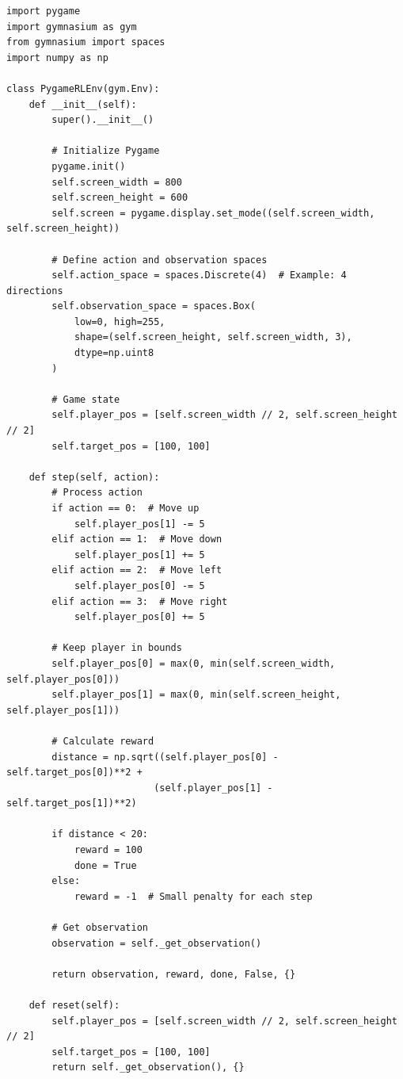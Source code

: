 \documentclass[12pt]{article}
\begin{document}
{{{\begin{verbatim}
import pygame
import gymnasium as gym
from gymnasium import spaces
import numpy as np

class PygameRLEnv(gym.Env):
    def __init__(self):
        super().__init__()
        
        # Initialize Pygame
        pygame.init()
        self.screen_width = 800
        self.screen_height = 600
        self.screen = pygame.display.set_mode((self.screen_width, self.screen_height))
        
        # Define action and observation spaces
        self.action_space = spaces.Discrete(4)  # Example: 4 directions
        self.observation_space = spaces.Box(
            low=0, high=255, 
            shape=(self.screen_height, self.screen_width, 3), 
            dtype=np.uint8
        )
        
        # Game state
        self.player_pos = [self.screen_width // 2, self.screen_height // 2]
        self.target_pos = [100, 100]
        
    def step(self, action):
        # Process action
        if action == 0:  # Move up
            self.player_pos[1] -= 5
        elif action == 1:  # Move down
            self.player_pos[1] += 5
        elif action == 2:  # Move left
            self.player_pos[0] -= 5
        elif action == 3:  # Move right
            self.player_pos[0] += 5
            
        # Keep player in bounds
        self.player_pos[0] = max(0, min(self.screen_width, self.player_pos[0]))
        self.player_pos[1] = max(0, min(self.screen_height, self.player_pos[1]))
        
        # Calculate reward
        distance = np.sqrt((self.player_pos[0] - self.target_pos[0])**2 + 
                          (self.player_pos[1] - self.target_pos[1])**2)
        
        if distance < 20:
            reward = 100
            done = True
        else:
            reward = -1  # Small penalty for each step
            
        # Get observation
        observation = self._get_observation()
        
        return observation, reward, done, False, {}
        
    def reset(self):
        self.player_pos = [self.screen_width // 2, self.screen_height // 2]
        self.target_pos = [100, 100]
        return self._get_observation(), {}
        

\end{verbatim}}}}
\end{document}
